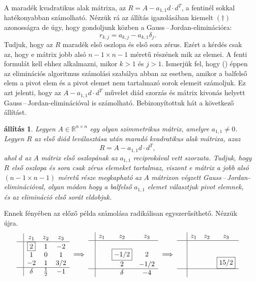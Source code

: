 \documentclass[9pt, a4paper, showtrims]{memoir}
\theoremstyle{plain}
\newtheorem{proposition}{állítás}[chapter]
\theoremstyle{remark}
\theoremstyle{definition}
\begin{document}
A maradék kvadratikus alak mátrixa, az $R=A-a_{1,1}d\cdot d^T$, a fentinél sokkal
hatékonyabban számolható.
Nézzük rá az állítás igazolásában kiemelt $(\dag)$ azonosságra de úgy,
hogy gondoljunk közben a Gauss\,--\,Jordan-eliminációra:
    \[
        r_{k,j}=
        a_{k,j}-a_{k,1}\delta_j.
        \tag{\dag}
    \]
Tudjuk, hogy az $R$ maradék első oszlopa és első sora zérus.
Ezért a kérdés csak az, 
hogy e mátrix jobb alsó $n-1\times n-1$ méretű részének mik az elemei.
A fenti formulát kell ehhez alkalmazni, mikor $k>1$ és $j>1$.
Ismerjük fel, hogy (\dag)  éppen az eliminációs algoritmus számolási szabálya abban az esetben, 
amikor a balfelső elem a pivot elem és a pivot elemet nem tartalmazó sorok elemeit számoljuk.
Ez azt jelenti, hogy az $A-a_{1,1}d\cdot d^T$ művelet diád szorzás és mátrix kivonás helyett Gauss\,--\,Jordan-eliminációval is számolható.
Bebizonyítottuk hát a következő állítást.
\begin{proposition}
   Legyen $A\in\mathbb{R}^{n\times n}$ egy olyan szimmetrikus mátrix,
   amelyre $a_{1,1}\neq 0$.
   Legyen $R$ az első diád leválasztása után maradó kvadratikus alak mátrixa,
   azaz 
   $$R=A-a_{1,1}d\cdot d^T,$$
   ahol $d$ az $A$ mátrix első oszlopának az $a_{1,1}$ reciprokával vett szorzata.
   Tudjuk, hogy $R$ első oszlopa és sora csak zérus elemeket tartalmaz, viszont e
   mátrix a jobb alsó $\left(n-1\times n-1  \right)$ méretű része megkapható
   az $A$ mátrixon végzett Gauss\,--\,Jordan-eliminációval, 
   olyan módon hogy a balfelső $a_{1,1}$ elemet választjuk pivot elemnek, 
   és az elimináció első sorát eldobjuk.
\end{proposition}
Ennek fényében az előző példa számolása radikálisan egyszerűsíthető. Nézzük újra.
\[
\begin{array}{c|ccc}
     & z_1       & z_2 & z_3 \\
     \hline
     & \boxed{2} & 1   & -2  \\
     & 1         & 0   & 1   \\
     & -2        & 1   & 3/2 \\
    \hline
    & \delta    & \frac{1}{2}   & -1
\end{array}
\implies
\begin{array}{c|ccc}
     & z_1       & z_2  & z_3 \\
     \hline
     & &                &       \\
     & & \boxed{-1/2}   & 2     \\
     & &            2   & -1/2  \\
     \hline
     & & \delta         & -4
\end{array}
\implies
\begin{array}{c|ccc}
     & z_1       & z_2 & z_3 \\
     \hline
     & &   &     \\
     & &   &     \\
     & &   & \boxed{15/2}    \\
    \hline
    \phantom{\delta}
\end{array}
\]
\end{document}
